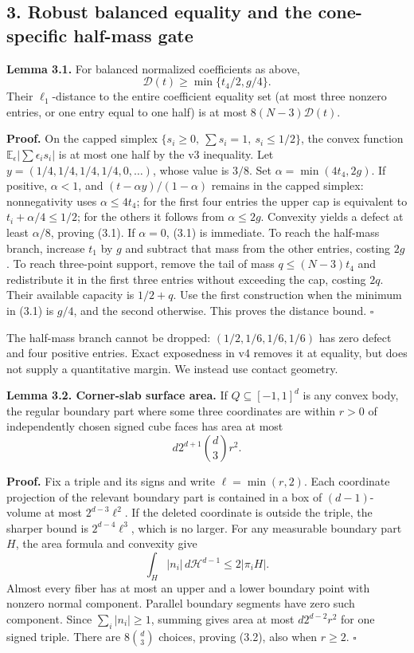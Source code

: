 \documentclass[
  11pt,
]{article}
\begin{document}
\subsection{3. Robust balanced equality and the cone-specific half-mass
gate}\label{robust-balanced-equality-and-the-cone-specific-half-mass-gate}

\textbf{Lemma 3.1.} For balanced normalized coefficients as above, \[
 \mathscr D(t)\ge\min\{t_4/2,g/4\}.                             \tag{3.1}
\] Their \(\ell_1\)-distance to the entire coefficient equality set (at
most three nonzero entries, or one entry equal to one half) is at most
\(8(N-3)\mathscr D(t)\).

\textbf{Proof.} On the capped simplex
\(\{s_i\ge0,\ \sum s_i=1,\ s_i\le1/2\}\), the convex function
\(\mathbb E_\epsilon|\sum\epsilon_i s_i|\) is at most one half by the v3
inequality. Let \(y=(1/4,1/4,1/4,1/4,0,\ldots)\), whose value is
\(3/8\). Set \(\alpha=\min(4t_4,2g)\). If positive, \(\alpha<1\), and
\((t-\alpha y)/(1-\alpha)\) remains in the capped simplex: nonnegativity
uses \(\alpha\le4t_4\); for the first four entries the upper cap is
equivalent to \(t_i+\alpha/4\le1/2\); for the others it follows from
\(\alpha\le2g\). Convexity yields a defect at least \(\alpha/8\),
proving (3.1). If \(\alpha=0\), (3.1) is immediate. To reach the
half-mass branch, increase \(t_1\) by \(g\) and subtract that mass from
the other entries, costing \(2g\). To reach three-point support, remove
the tail of mass \(q\le(N-3)t_4\) and redistribute it in the first three
entries without exceeding the cap, costing \(2q\). Their available
capacity is \(1/2+q\). Use the first construction when the minimum in
(3.1) is \(g/4\), and the second otherwise. This proves the distance
bound. \(\square\)

The half-mass branch cannot be dropped: \((1/2,1/6,1/6,1/6)\) has zero
defect and four positive entries. Exact exposedness in v4 removes it at
equality, but does not supply a quantitative margin. We instead use
contact geometry.

\textbf{Lemma 3.2. Corner-slab surface area.} If \(Q\subseteq[-1,1]^d\)
is any convex body, the regular boundary part where some three
coordinates are within \(r>0\) of independently chosen signed cube faces
has area at most \[
 d2^{d+1}\binom d3r^2.                                         \tag{3.2}
\]

\textbf{Proof.} Fix a triple and its signs and write \(\ell=\min(r,2)\).
Each coordinate projection of the relevant boundary part is contained in
a box of \((d-1)\)-volume at most \(2^{d-3}\ell^2\). If the deleted
coordinate is outside the triple, the sharper bound is
\(2^{d-4}\ell^3\), which is no larger. For any measurable boundary part
\(H\), the area formula and convexity give \[
 \int_H |n_i|\,d\mathcal H^{d-1}\le2|\pi_iH|.
\] Almost every fiber has at most an upper and a lower boundary point
with nonzero normal component. Parallel boundary segments have zero such
component. Since \(\sum_i|n_i|\ge1\), summing gives area at most
\(d2^{d-2}r^2\) for one signed triple. There are \(8\binom d3\) choices,
proving (3.2), also when \(r\ge2\). \(\square\)
\end{document}
